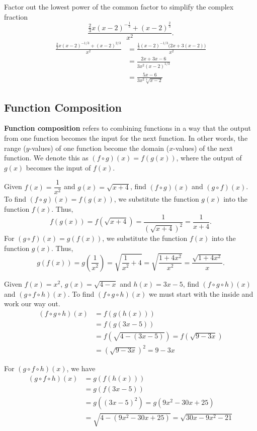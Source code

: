 \begin{example}\label{ex_prereq_fraction}
Factor out the lowest power of the common factor to simplify the complex fraction
\[\frac{\frac23 x(x-2)^{-\frac13}+(x-2)^{\frac23}}{x^2}.\]
\solution
\begin{align*}
 \frac{\frac23 x(x-2)^{-1/3}+(x-2)^{2/3}}{x^2}
 &= \frac{\frac13 (x-2)^{-1/3}\bigl(2x + 3(x-2)\bigr)}{x^2} \\
 &= \frac{2x+3x-6}{3x^2(x-2)^{1/3}}\\
 &= \frac{5x-6}{3x^2\sqrt[3]{x-2}}
\end{align*}
\end{example}

\subsection{Function Composition}

\textbf{Function composition} refers to combining functions in a way that the output from one function becomes the input for the next function. In other words, the range ($y$-values) of one function become the domain ($x$-values) of the next function. We denote this as $(f \circ g)(x) = f(g(x))$, where the output of $g(x)$ becomes the input of $f(x)$.

\begin{example}\label{ex_prereq_comp_of_two}
Given $f(x)=\dfrac1{x^2}$ and $g(x)=\sqrt{x+4}$, find $(f \circ g)(x)$ and $(g \circ f)(x)$.
\solution
To find $(f\circ g)(x)=f(g(x))$, we substitute the function $g(x)$ into the function $f(x)$. Thus,
\[f(g(x))=f\left(\sqrt{x+4}\right)=\frac1{(\sqrt{x+4})^2}=\frac1{x+4}.\]
For $(g\circ f)(x)=g(f(x))$, we substitute the function $f(x)$ into the function $g(x)$. Thus,
\[
 g(f(x))=g\left(\frac1{x^2}\right)=\sqrt{\frac1{x^2}+4}
 =\sqrt{\frac{1+4x^2}{x^2}}=\frac{\sqrt{1+4x^2}}x.
\]
\end{example}

\begin{example}\label{ex_prereq_comp_of_three}
Given $f(x)=x^2$, $g(x)=\sqrt{4-x}$ and $h(x)=3x-5$, find $(f\circ g\circ h)(x)$ and $(g\circ f\circ h)(x)$.
\solution
To find $(f\circ g\circ h)(x)$ we must start with the inside and work our way out.
\begin{align*}
(f\circ g\circ h)(x)&=f(g(h(x)))\\
&=f(g(3x-5))\\
&=f\left(\sqrt{4-(3x-5)}\right)=f\left(\sqrt{9-3x}\right)\\
&=\left(\sqrt{9-3x}\right)^2=9-3x
\end{align*}

For $(g\circ f\circ h)(x)$, we have
\begin{align*}
(g\circ f\circ h)(x)&=g(f(h(x)))\\
&=g(f(3x-5))\\
&=g((3x-5)^2)=g(9x^2-30x+25)\\
&=\sqrt{4-(9x^2-30x+25)}=\sqrt{30x-9x^2-21}
\end{align*}
\end{example}

